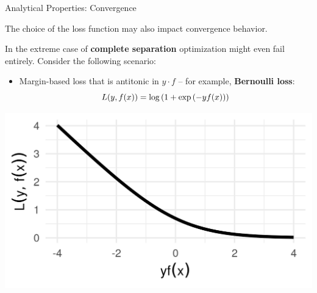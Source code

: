 
\begin{vbframe}{Analytical Properties: Convergence}

\small
The choice of the loss function may also impact convergence behavior.

\vspace{0.2cm}

In the extreme case of \textbf{complete separation} optimization might even 
fail entirely. Consider the following scenario:

\vspace{0.5cm}

\begin{minipage}{0.7\textwidth}
  \begin{itemize}
    \small
    \item Margin-based loss that is antitonic in
    $y \cdot f$ -- for example, \textbf{Bernoulli loss}: 
    $$L(y, f(x)) = \log \left( 1 + \exp \left( - y  f(x) \right)\right)$$
  \end{itemize}
\end{minipage}%
\begin{minipage}{0.05\textwidth}
  \phantom{foo}
\end{minipage}%
\begin{minipage}{0.25\textwidth}
  \includegraphics[width=\textwidth]{figure/plot_bernoulli}
\end{minipage}%

\vspace{0.3cm}


\end{vbframe}
